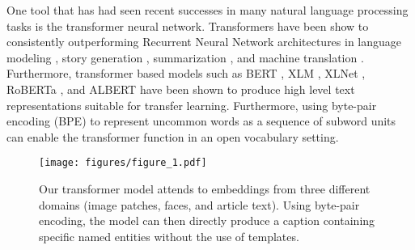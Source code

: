 One tool that has had seen recent successes in many natural language processing
tasks is the transformer neural network.
Transformers have been show to consistently
outperforming Recurrent Neural Network architectures in language modeling
\cite{Radford2019LanguageMA},
story generation \cite{Fan2018HierarchicalNS}, summarization
\cite{Subramanian2019OnEA}, and machine translation \cite{Bojar2018Findings}.
Furthermore, transformer based models such as BERT \cite{Devlin2019BERT}, XLM
\cite{Lample2019CrosslingualLM}, XLNet \cite{Yang2019XLNetGA}, RoBERTa
\cite{Liu2019RoBERTaAR}, and ALBERT \cite{Lan2019ALBERT} have been shown to
produce high level text representations suitable for transfer learning.
Furthermore, using byte-pair
encoding (BPE) \cite{Sennrich2015NeuralMT} to represent uncommon words as a
sequence of subword units can enable the transformer function in an open
vocabulary setting.




\begin{figure}[t]
	\begin{center}
		\texttt{[image: figures/figure\_1.pdf]}
	\end{center}
	\caption{Our transformer model attends to embeddings from three different
		domains (image patches, faces, and article text). Using byte-pair
		encoding, the model can then directly produce a caption containing
		specific named entities without the use of templates.}
	\label{fig:long}
	\label{fig:teaser}
\end{figure}

